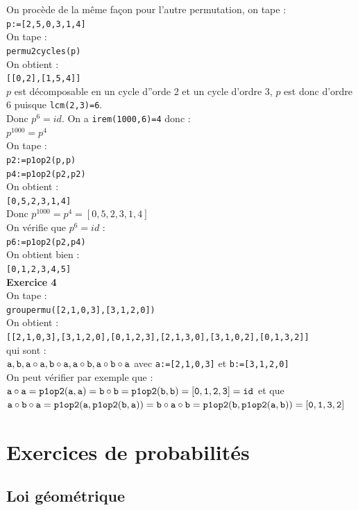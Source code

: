 \documentclass[a4paper,11pt]{book}
\begin{document}
On proc\`ede de la m\^eme fa\c{c}on pour l'autre permutation, on tape :\\
{\tt p:=[2,5,0,3,1,4]}\\
On tape :\\
{\tt permu2cycles(p)}\\
On obtient :\\
{\tt [[0,2],[1,5,4]]}\\
$p$ est d\'ecomposable en un cycle d''orde 2 et un cycle d'ordre 3, $p$ est donc d'ordre 6 puisque {\tt lcm(2,3)=6}.\\
Donc $p^6=id$. On a {\tt irem(1000,6)=4} donc :\\
$p^{1000}=p^4$\\
On tape :\\
{\tt p2:=p1op2(p,p)}\\
{\tt p4:=p1op2(p2,p2)}\\
On obtient :\\
{\tt [0,5,2,3,1,4]}\\
Donc $p^{1000}=p^4=[0,5,2,3,1,4]$\\
On v\'erifie que $p^6=id$ :\\
{\tt p6:=p1op2(p2,p4)}\\
On obtient bien :\\
{\tt [0,1,2,3,4,5]}\\

{\bf Exercice 4}\\
On tape :\\
{\tt groupermu([2,1,0,3],[3,1,2,0])}\\
On obtient :\\
{\tt [[2,1,0,3],[3,1,2,0],[0,1,2,3],[2,1,3,0],[3,1,0,2],[0,1,3,2]]}\\
qui sont :\\
${\tt a,b,a\circ a,b\circ a,a\circ b,a\circ b\circ a }$ avec {\tt a:=[2,1,0,3]} et {\tt b:=[3,1,2,0]}\\
On peut v\'erifier par exemple que :\\
${\tt a\circ a=p1op2(a,a)=b\circ b=p1op2(b,b)=[0,1,2,3]=id}$ et que \\
${\tt a\circ b\circ a=p1op2(a,p1op2(b,a))=b\circ a\circ b=p1op2(b,p1op2(a,b))=[0,1,3,2]}$
\chapter{Exercices de probabilit\'es}
\section{Loi g\'eom\'etrique}
\end{document}
